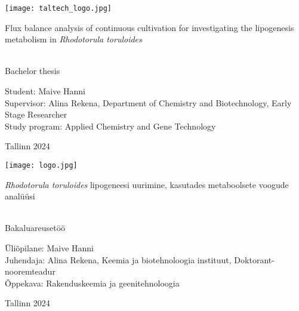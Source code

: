 \documentclass[a4paper, 11pt]{report}
\begin{document}
\begin{titlepage}
    \texttt{[image: taltech\_logo.jpg]}

    \begin{center}
        \vspace{35mm}
        \begin{LARGE}
            Flux balance analysis of continuous cultivation for investigating
            the lipogenesis metabolism in \textit{Rhodotorula toruloides}
        \end{LARGE} \\
             Bachelor thesis

        \vspace{30mm}
        \hfill
        \parbox{50mm}{
            Student: Maive Hanni \\
            Supervisor: Alina Rekena, Department of Chemistry and Biotechnology, Early Stage Researcher \\
            Study program: Applied Chemistry and Gene Technology
            }

        \vfill
        Tallinn 2024
    \end{center}
\end{titlepage}

\begin{titlepage}
    \texttt{[image: logo.jpg]}

    \begin{center}
        \vspace{35mm}
        \begin{LARGE}
            \textit{Rhodotorula toruloides} lipogeneesi uurimine, kasutades metaboolsete voogude analüüsi
        \end{LARGE} \\
            Bakaluareusetöö

        \vspace{30mm}
        \hfill
        \parbox{50mm}{
            Üliõpilane: Maive Hanni \\
            Juhendaja: Alina Rekena, Keemia ja biotehnoloogia instituut, Doktorant-nooremteadur \\
            Õppekava: Rakenduskeemia ja geenitehnoloogia
            }

        \vfill
        Tallinn 2024
    \end{center}
\end{titlepage}



\tableofcontents
\end{document}
